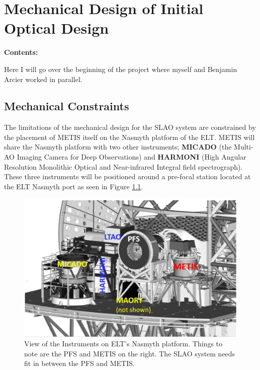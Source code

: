 
\chapter{Mechanical Design of Initial Optical Design} %

\noindent\textbf{\large Contents:}

\noindent\hrulefill
\noindent\startcontents[chapters]
\noindent{}
\noindent\hrulefill

\label{Chapter2} %


Here I will go over the beginning of the project where myself and Benjamin Arcier worked in parallel.

\section{Mechanical Constraints}
\label{sec:mech_const}

The limitations of the mechanical design for the SLAO system are constrained by the
placement of METIS itself on the Nasmyth platform of the ELT.  METIS will share the
Nasmyth platform with two other instruments; \textbf{MICADO} (the Multi-AO Imaging
Camera for Deep Observations) and \textbf{HARMONI} (High Angular Resolution
Monolithic Optical and Near-infrared Integral field spectrograph).  These three
instruments will be positioned around a pre-focal station located at the ELT Nasmyth
port as seen in Figure \ref{fig:ELT_nas_deck}.

\begin{figure}[h!]
\centering
\includegraphics[width=12 cm]{Figures/ELT_nas_deck.png}
\caption{View of the Instruments on ELT's Nasmyth platform.  Things to note are the PFS and METIS on the right.  The SLAO
system needs fit in between the PFS and METIS. \cite{METISupdate}}
\label{fig:ELT_nas_deck}
\end{figure}

